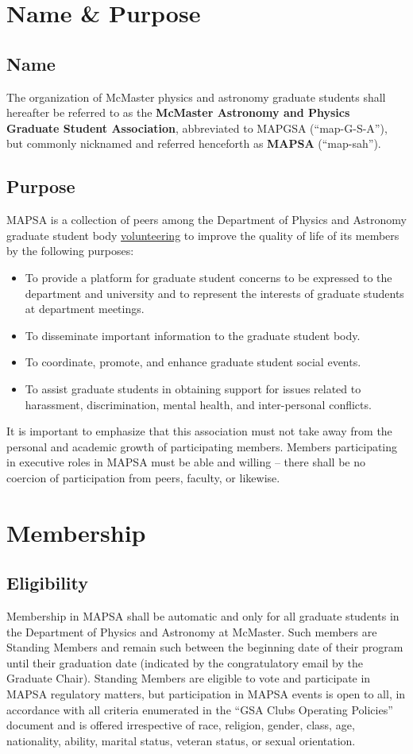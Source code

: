\documentclass[8pt]{article}
\begin{document}
	\section{Name \& Purpose}
	\subsection{Name}
	The organization of McMaster physics and astronomy graduate students shall hereafter be referred to as the \textbf{McMaster Astronomy and Physics Graduate Student Association}, abbreviated to MAPGSA (``map-G-S-A''), but commonly nicknamed and referred henceforth as \textbf{MAPSA} (``map-sah'').
	\subsection{Purpose}
	MAPSA is a collection of peers among the Department of Physics and Astronomy graduate student body \underline{volunteering} to improve the quality of life of its members by the following purposes:
	\begin{itemize}
		\item To provide a platform for graduate student concerns to be expressed to the department and university and to represent the interests of graduate students at department meetings.
		\item To disseminate important information to the graduate student body.
		\item To coordinate, promote, and enhance graduate student social events.
		\item To assist graduate students in obtaining support for issues related to harassment, discrimination, mental health, and inter-personal conflicts.
	\end{itemize}
	It is important to emphasize that this association must not take away from the personal and academic growth of participating members. Members participating in executive roles in MAPSA must be able and willing -- there shall be no coercion of participation from peers, faculty, or likewise.
	
	\section{Membership}
	\subsection{Eligibility}
	Membership in MAPSA shall be automatic and only for all graduate students in the Department of Physics and Astronomy at McMaster. Such members are Standing Members and remain such between the beginning date of their program until their graduation date (indicated by the congratulatory email by the Graduate Chair). Standing Members are eligible to vote and participate in MAPSA regulatory matters, but participation in MAPSA events is open to all, in accordance with all criteria enumerated in the ``GSA Clubs Operating Policies'' document and is offered irrespective of race, religion, gender, class, age, nationality, ability, marital status, veteran status, or sexual orientation. 
	
\end{document}

